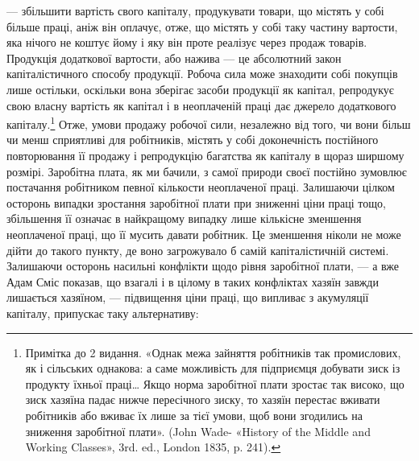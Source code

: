 — збільшити вартість свого капіталу, продукувати товари,
що містять у собі більше праці, аніж він оплачує, отже,
що містять у собі таку частину вартости, яка нічого не коштує
йому і яку він проте реалізує через продаж товарів. Продукція
додаткової вартости, або нажива — це абсолютний закон капіталістичного
способу продукції. Робоча сила може знаходити
собі покупців лише остільки, оскільки вона зберігає засоби продукції
як капітал, репродукує свою власну вартість як капітал
і в неоплаченій праці дає джерело додаткового капіталу.\footnote{
Примітка до 2 видання. «Однак межа зайняття робітників так
промислових, як і сільських однакова: а саме можливість для підприємця
добувати зиск із продукту їхньої праці\dots{} Якщо норма заробітної
плати зростає так високо, що зиск хазяїна падає нижче пересічного
зиску, то хазяїн перестає вживати робітників або вживає їх лише за
тієї умови, щоб вони згодились на зниження заробітної плати». (John
Wade- «History of the Middle and Working Classes», 3rd. ed., London
1835, p. 241).
} Отже,
умови продажу робочої сили, незалежно від того, чи вони більш
чи менш сприятливі для робітників, містять у собі доконечність
постійного повторювання її продажу і репродукцію багатства
як капіталу в щораз ширшому розмірі. Заробітна плата, як ми
бачили, з самої природи своєї постійно зумовлює постачання
робітником певної кількости неоплаченої праці. Залишаючи
цілком осторонь випадки зростання заробітної плати при зниженні
ціни праці тощо, збільшення її означає в найкращому
випадку лише кількісне зменшення неоплаченої праці, що її
мусить давати робітник. Це зменшення ніколи не може дійти до
такого пункту, де воно загрожувало б самій капіталістичній
системі. Залишаючи осторонь насильні конфлікти щодо рівня
заробітної плати, — а вже Адам Сміс показав, що взагалі і в цілому
в таких конфліктах хазяїн завжди лишається хазяїном, —
підвищення ціни праці, що випливає з акумуляції капіталу,
припускає таку альтернативу:

